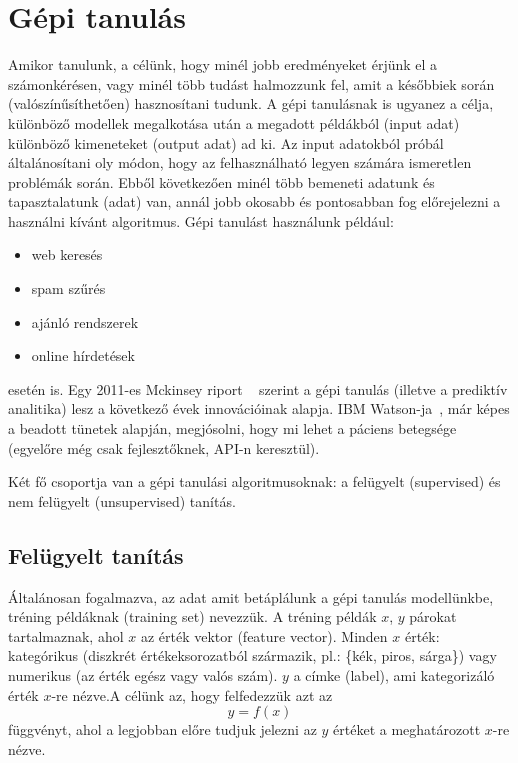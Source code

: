 \documentclass[a4paper,12pt]{article}
\begin{document}
\section{Gépi tanulás}

Amikor tanulunk, a célünk, hogy minél jobb eredményeket érjünk el a számonkérésen, vagy minél több tudást halmozzunk fel, amit a későbbiek során (valószínűsíthetően) hasznosítani tudunk. A gépi tanulásnak is ugyanez a célja, különböző modellek megalkotása után a megadott példákból (input adat) különböző kimeneteket (output adat) ad ki. Az input adatokból próbál általánosítani oly módon, hogy az felhasználható legyen számára ismeretlen problémák során. Ebből következően minél több bemeneti adatunk és tapasztalatunk (adat) van, annál jobb okosabb és pontosabban fog előrejelezni a használni kívánt algoritmus. Gépi tanulást használunk például: 
\begin{itemize}
\item web keresés
\item spam szűrés
\item ajánló rendszerek
\item online hírdetések
\end{itemize}
esetén is. 
Egy 2011-es Mckinsey riport ~\cite{mckinsey} szerint a gépi tanulás (illetve a prediktív analitika) lesz a következő évek innovációinak alapja. IBM Watson-ja~\cite{watson}, már képes a beadott tünetek alapján, megjósolni, hogy mi lehet a páciens betegsége (egyelőre még csak fejlesztőknek, API-n keresztül). \linebreak

Két fő csoportja van a gépi tanulási algoritmusoknak: a felügyelt (supervised) és nem felügyelt (unsupervised) tanítás.

\subsection{Felügyelt tanítás}

Általánosan fogalmazva, az adat amit betáplálunk a gépi tanulás modellünkbe, tréning példáknak (training set) nevezzük. A tréning példák $x$, $y$ párokat tartalmaznak, ahol $x$ az érték vektor (feature vector). Minden $x$ érték: kategórikus (diszkrét értékeksorozatból származik, pl.: \{kék, piros, sárga\}) vagy numerikus (az érték egész vagy valós szám). $y$ a címke (label), ami kategorizáló érték $x$-re nézve.A célünk az, hogy felfedezzük azt az 
\begin{equation*} y=f(x)
\end{equation*}
függvényt, ahol a legjobban előre tudjuk jelezni az $y$ értéket a meghatározott $x$-re nézve.
\end{document}
